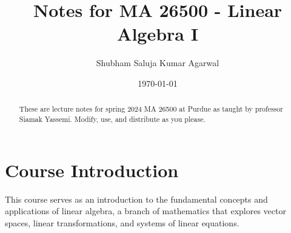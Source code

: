 \documentclass[nobib]{tufte-handout}
\title{Notes for MA 26500 - Linear Algebra I}
\author[Shubham Saluja Kumar Agarwal]{Shubham Saluja Kumar Agarwal}
\date{\today}  %
\begin{document}
\maketitle

\begin{abstract}
    These are lecture notes for spring 2024 MA 26500 at Purdue as taught by professor Siamak Yassemi. Modify, use, and distribute as you please.
\end{abstract}

\tableofcontents

\section{Course Introduction}
This course serves as an introduction to the fundamental concepts and
applications of linear algebra, a branch of mathematics that explores vector
spaces, linear transformations, and systems of linear equations.

\pagebreak
\end{document}
